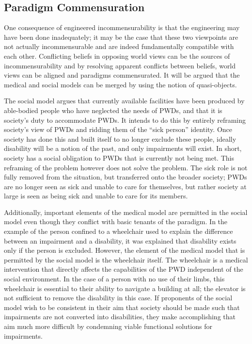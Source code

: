 \documentclass[a4paper]{article}
\begin{document}
\subsection{Paradigm Commensuration}

One consequence of engineered incommensurability is that the engineering may
have been done inadequately; it may be the case that these two viewpoints are
not actually incommensurable and are indeed fundamentally compatible with each
other. Conflicting beliefs in opposing world views can be the sources of
incommensurability and by resolving apparent conflicts between beliefs, world
views can be aligned and paradigms commensurated. It will be argued that the
medical and social models can be merged by using the notion of quasi-objects.

The social model argues that currently available facilities have been produced
by able-bodied people who have neglected the needs of PWDs, and that it is
society's duty to accommodate PWDs. It intends to do this by entirely
reframing society's view of PWDs and ridding them of the ``sick person''
identity. Once society has done this and built itself to no longer exclude
these people, ideally disability will be a notion of the past, and only
impairments will exist. In short, society has a social obligation to PWDs that
is currently not being met. This reframing of the problem however does not
solve the problem. The sick role is not fully removed from the situation, but
transferred onto the broader society; PWDs are no longer seen as sick and
unable to care for themselves, but rather society at large is seen as being
sick and unable to care for its members.

Additionally, important elements of the medical model are permitted in the
social model even though they conflict with basic tenants of the paradigm. In
the example of the person confined to a wheelchair used to explain the
difference between an impairment and a disability, it was explained that
disability exists only if the person is excluded. However, the element of the
medical model that is permitted by the social model is the wheelchair itself.
The wheelchair is a medical intervention that directly affects the
capabilities of the PWD independent of the social environment. In the case of
a person with no use of their limbs, this wheelchair is essential to their
ability to navigate a building at all; the elevator is not sufficient to
remove the disability in this case. If proponents of the social model wish to
be consistent in their aim that society should be made such that impairments
are not converted into disabilities, they make accomplishing that aim much
more difficult by condemning viable functional solutions for impairments.
\end{document}
